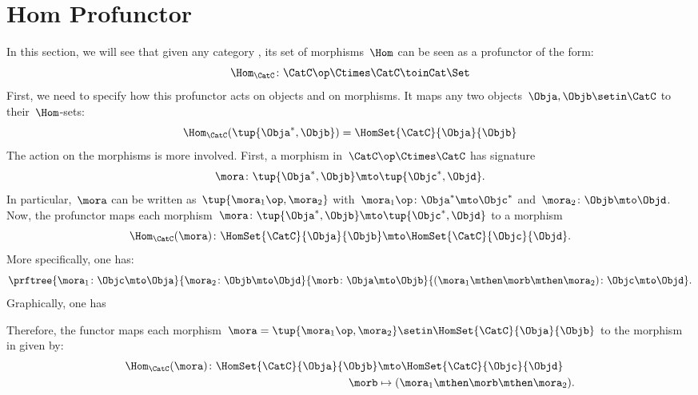 
\section{Hom Profunctor}

In this section, we will see that given any category \CatC, its set of morphisms~$\Hom$ can be seen as a profunctor of the form:
\begin{equation}
    \label{eq:hom-signature}
    \Hom_\CatC\colon \CatC \op \Ctimes \CatC \toinCat \Set
\end{equation}
First, we need to specify how this profunctor acts on objects and on morphisms.
It maps any two objects~$\Obja,\Objb\setin \CatC$ to their~$\Hom$-sets:
\begin{equation}
    \label{eq:hom-action}
    \Hom_\CatC(\tup{\Obja^*,\Objb})=\HomSet{\CatC}{\Obja}{\Objb}
\end{equation}
The action on the morphisms is more involved.
First, a morphism in~$\CatC\op \Ctimes \CatC$ has signature
%
\begin{equation}
    \label{eq:hom0}
    \mora \colon \tup{\Obja^*,\Objb}\mto \tup{\Objc^*, \Objd}.
\end{equation}
%
In particular,~$\mora$ can be written as~$\tup{\mora_1\op,\mora_2}$ with~$\mora_1\op\colon \Obja^*\mto \Objc^*$ and~$\mora_2\colon \Objb\mto \Objd$.
Now, the profunctor maps each morphism~$\mora \colon \tup{\Obja^*,\Objb}\mto \tup{\Objc^*, \Objd}$ to a morphism
%
\begin{equation}
    \label{eq:hom2}
    \Hom_\CatC(\mora)\colon \HomSet{\CatC}{\Obja}{\Objb}\mto \HomSet{\CatC}{\Objc}{\Objd}.
\end{equation}
%
More specifically, one has:
%
\begin{equation}
    \label{eq:hom3}
    \prftree{
        \mora_1\colon \Objc \mto \Obja
    }{
        \mora_2\colon \Objb\mto \Objd
    }{
        \morb\colon \Obja\mto \Objb
    }{
        (\mora_1\mthen \morb \mthen \mora_2)\colon \Objc\mto \Objd
    }.
\end{equation}
%
Graphically, one has
\begin{center}
\end{center}
%
Therefore, the functor maps each morphism~$\mora=\tup{\mora_1\op,\mora_2}\setin \HomSet{\CatC}{\Obja}{\Objb}$ to the morphism in \Set given by:
%
\begin{equation}
    \label{eq:hom4}
    \begin{aligned}
        \Hom_\CatC(\mora)\colon \HomSet{\CatC}{\Obja}{\Objb} & \mto \HomSet{\CatC}{\Objc}{\Objd} \\
        \morb                                                & \mapsto (\mora_1\mthen \morb \mthen \mora_2).
    \end{aligned}
\end{equation}

